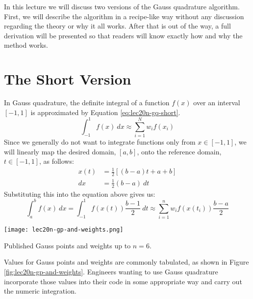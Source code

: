In this lecture we will discuss two versions of the Gauss quadrature algorithm.  First, we will describe the algorithm in a recipe-like way without any discussion regarding the theory or why it all works.  After that is out of the way, a full derivation will be presented so that readers will know exactly how and why the method works.

\section{The Short Version}
In Gauss quadrature, the definite integral of a function $f(x)$ over an interval $[-1,1]$ is approximated by Equation \ref{eq:lec20n-gq-short}.
\begin{equation}
\int_{-1}^{1} f(x) \ dx \approx \sum\limits_{i=1}^{N}w_i f(x_i)
\label{eq:lec20n-gq-short}
\end{equation}
Since we generally do not want to integrate functions only from $x\in[-1,1]$, we will linearly map the desired domain, $[a,b]$, onto the reference domain, $t \in [-1,1]$, as follows:
\begin{align*}
x(t) &= \frac{1}{2}\left[(b-a)t + a + b \right] \\
dx &= \frac{1}{2}(b-a) \ dt
\end{align*}
Substituting this into the equation above gives us:
\begin{equation}
\int_{a}^{b}f(x) \ dx = \int_{-1}^{1}f(x(t))\frac{b-1}{2} \ dt \approx \sum\limits_{i=1}^{n}w_i f(x(t_i))\frac{b-a}{2}
\label{eq:lec20n-gp-formula}
\end{equation}

\begin{marginfigure}
\texttt{[image: lec20n-gp-and-weights.png]}
\caption{Published Gauss points and weights up to $n=6$.}
\label{fig:lec20n-gp-and-weights}
\end{marginfigure}
Values for Gauss points and weights are commonly tabulated, as shown in Figure \ref{fig:lec20n-gp-and-weights}. Engineers wanting to use Gauss quadrature incorporate those values into their code in some appropriate way and carry out the numeric integration.

